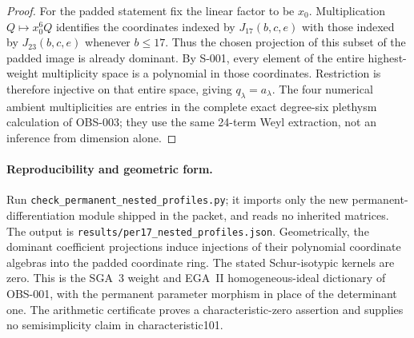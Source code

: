 \begin{proof}
For the padded statement fix the linear factor to be $x_0$.
Multiplication $Q\mapsto x_0^6Q$ identifies the coordinates indexed by
$J_{17}(b,c,e)$ with those indexed by $J_{23}(b,c,e)$ whenever $b\le17$.
Thus the chosen projection of this subset of the padded image is already
dominant. By S-001, every element of the entire highest-weight
multiplicity space is a polynomial in those coordinates. Restriction is
therefore injective on that entire space, giving $q_\lambda=a_\lambda$.
The four numerical ambient multiplicities are entries in the complete
exact degree-six plethysm calculation of OBS-003; they use the same
24-term Weyl extraction, not an inference from dimension alone.
\end{proof}

\paragraph{Reproducibility and geometric form.}
Run \texttt{check\_permanent\_nested\_profiles.py}; it imports only the
new permanent-differentiation module shipped in the packet, and reads no
inherited matrices. The output is
\texttt{results/per17\_nested\_profiles.json}.
Geometrically, the dominant coefficient projections induce injections of
their polynomial coordinate algebras into the padded coordinate ring.
The stated Schur-isotypic kernels are zero. This is the SGA~3 weight and
EGA~II homogeneous-ideal dictionary of OBS-001, with the permanent
parameter morphism in place of the determinant one. The arithmetic
certificate proves a characteristic-zero assertion and supplies no
semisimplicity claim in characteristic101.

